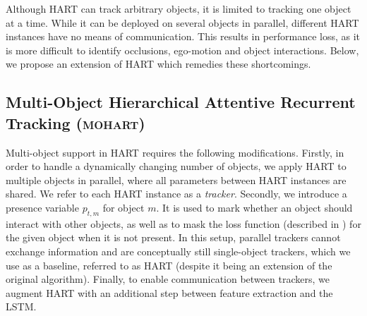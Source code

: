 Although \gls{HART} can track arbitrary objects, it is limited to tracking one object at a time.
While it can  be deployed on several objects in parallel, different \gls{HART} instances have no means of communication.
This results in performance loss, as it is more difficult to identify 
occlusions, ego-motion and object interactions.
Below, we propose an extension of \gls{HART} which remedies these shortcomings.

\subsection{Multi-Object Hierarchical Attentive Recurrent Tracking (\textsc{mohart})}
\vspace{-3mm}
Multi-object support in \gls{HART} requires the following modifications.
Firstly, in order to handle a dynamically changing number of objects, we apply \gls{HART} to multiple objects in parallel, where all parameters between \gls{HART} instances are shared. 
We refer to each \gls{HART} instance as a \textit{tracker}.
Secondly, we introduce a presence variable $p_{t,m}$ for object $m$.
It is used to mark whether an object should interact with other objects, as well as to mask the loss function (described in ) for the given object when it is not present.
In this setup, parallel trackers cannot exchange information and are conceptually still single-object trackers, which we use as a baseline, referred to as \gls{HART} (despite it being an extension of the original algorithm).
Finally, to enable communication between trackers, we augment \gls{HART} with an additional step between feature extraction and the \gls{LSTM}.

